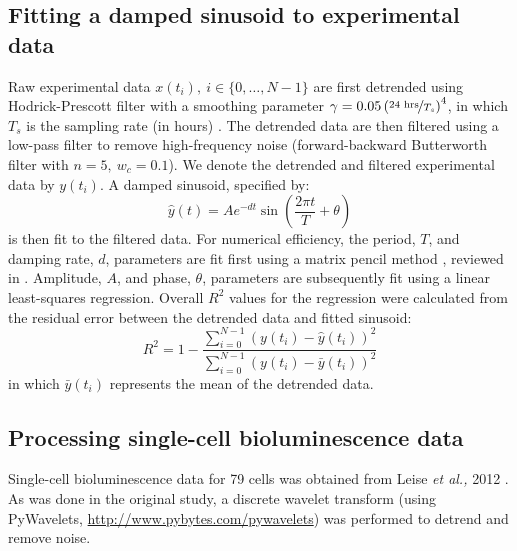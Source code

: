 \subsection{Fitting a damped sinusoid to experimental data}
Raw experimental data $x(t_i), \  i \in \{0, \dots, N-1\}$ are first detrended using Hodrick-Prescott filter with a smoothing parameter $\gamma = 0.05\left(\nicefrac{24 \text{ hrs}}{T_s}\right)^4$, in which $T_s$ is the sampling rate (in hours) \cite{Ravn2002}.
The detrended data are then filtered using a low-pass filter to remove high-frequency noise (forward-backward Butterworth filter with $n = 5,\ w_c = 0.1$).
We denote the detrended and filtered experimental data by $y(t_i)$.
A damped sinusoid, specified by:
\[
  \hat{y}(t) = A e^{-d t} \sin\left(\frac{2\pi t}{T} + \theta\right)
\]
is then fit to the filtered data.
For numerical efficiency, the period, $T$, and damping rate, $d$, parameters are fit first using a matrix pencil method \cite{Hua1990}, reviewed in \cite{Zielinski2011}.
Amplitude, $A$, and phase, $\theta$, parameters are subsequently fit using a linear least-squares regression.
Overall $R^2$ values for the regression were calculated from the residual error between the detrended data and fitted sinusoid:
\[
  R^2 = 1 - \frac{\sum_{i = 0}^{N-1} (y(t_i) - \hat{y}(t_i))^2}{\sum_{i = 0}^{N-1} (y(t_i) - \bar{y}(t_i))^2}
\]
in which $\bar{y}(t_i)$ represents the mean of the detrended data.

\subsection{Processing single-cell bioluminescence data}

Single-cell bioluminescence data for 79 cells was obtained from Leise {\itshape et al.,} 2012 \cite{Leise2012}.
As was done in the original study, a discrete wavelet transform (using PyWavelets, \url{http://www.pybytes.com/pywavelets}) was performed to detrend and remove noise.

